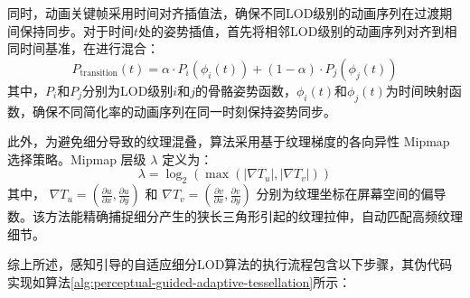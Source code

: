 同时，动画关键帧采用时间对齐插值法，确保不同LOD级别的动画序列在过渡期间保持同步。对于时间$t$处的姿势插值，首先将相邻LOD级别的动画序列对齐到相同时间基准，在进行混合：
\begin{equation}
P_{\text{transition}}(t) = \alpha \cdot P_i(\phi_i(t)) + (1-\alpha) \cdot P_j(\phi_j(t))
\label{eq:pose_interpolation}
\end{equation}
其中，$P_i$和$P_j$分别为LOD级别$i$和$j$的骨骼姿势函数，$\phi_i(t)$和$\phi_j(t)$为时间映射函数，确保不同简化率的动画序列在同一时刻保持姿势同步。

此外，为避免细分导致的纹理混叠，算法采用基于纹理梯度的各向异性 Mipmap 选择策略。Mipmap 层级 $\lambda$ 定义为：
\begin{equation}
\lambda = \log_2 \left( \max \left( | \nabla T_u |, | \nabla T_v | \right) \right)
\label{eq:mipmap_gradient}
\end{equation}
其中， $\nabla T_u = (\frac{\partial u}{\partial x}, \frac{\partial u}{\partial y})$ 和 $\nabla T_v = (\frac{\partial v}{\partial x}, \frac{\partial v}{\partial y})$ 分别为纹理坐标在屏幕空间的偏导数。该方法能精确捕捉细分产生的狭长三角形引起的纹理拉伸，自动匹配高频纹理细节。

综上所述，感知引导的自适应细分LOD算法的执行流程包含以下步骤，其伪代码实现如算法\ref{alg:perceptual-guided-adaptive-tessellation}所示：

